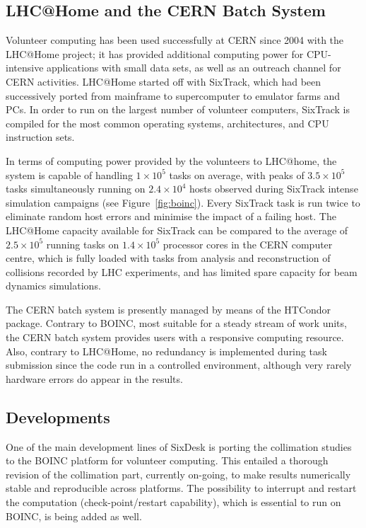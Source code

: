 \documentclass[a4paper,
              ]{jacow}
\begin{document}
\subsection{LHC@Home and the CERN Batch System}

Volunteer computing has been used successfully at CERN since 2004 with the LHC@Home project; it has provided additional computing power for CPU-intensive applications with small data sets, as well as an outreach channel for CERN activities. LHC@Home started off with SixTrack, which had been successively ported from mainframe to supercomputer to emulator farms and PCs. In order to run on the largest number of volunteer computers, SixTrack is compiled for the most common operating systems, architectures, and CPU instruction sets.

In terms of computing power provided by the volunteers to LHC@home, the system is capable of handling $1\times 10^5$ tasks on average, with peaks of $3.5 \times 10^5$ tasks simultaneously running on $2.4 \times 10^4$ hosts observed during SixTrack intense simulation campaigns (see Figure~\ref{fig:boinc}). Every SixTrack task is run twice to eliminate random host errors and minimise the impact of a failing host. The LHC@Home capacity available for SixTrack can be compared to the average of $2.5 \times 10^5$ running tasks on $1.4 \times 10^5$ processor cores in the CERN computer centre, which is fully loaded with tasks from analysis and reconstruction of collisions recorded by LHC experiments, and has limited spare capacity for beam dynamics simulations.

The CERN batch system is presently managed by means of the HTCondor~\cite{HTCondor} package. Contrary to BOINC, most suitable for a steady stream of work units, the CERN batch system provides users with a responsive computing resource. Also, contrary to LHC@Home, no redundancy is implemented during task submission since the code run in a controlled environment, although very rarely hardware errors do appear in the results.

\subsection{Developments}

One of the main development lines of SixDesk is porting the collimation studies to the BOINC platform for volunteer computing. This entailed a thorough revision of the collimation part, currently on-going, to make results numerically stable and reproducible across platforms. The possibility to interrupt and restart the computation (check-point/restart capability), which is essential to run on BOINC,  is being added as well.
\end{document}
